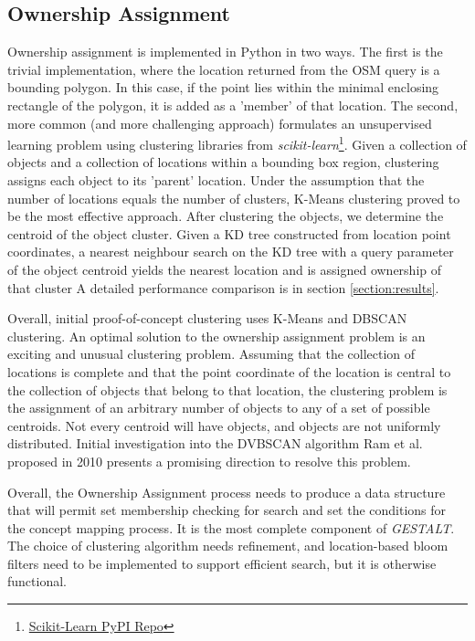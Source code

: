 \subsection{Ownership Assignment}
Ownership assignment is implemented in Python in two ways. The first is the trivial implementation, where the location returned from the OSM query is a bounding polygon. 
In this case, if the point lies within the minimal enclosing rectangle of the polygon, it is added as a 'member' of that location. 
The second, more common (and more challenging approach) formulates an unsupervised learning problem using clustering libraries from \textit{scikit-learn}\footnote{\href{https://pypi.org/project/scikit-learn/}{Scikit-Learn PyPI Repo}}. 
Given a collection of objects and a collection of locations within a bounding box region, clustering assigns each object to its 'parent' location. 
Under the assumption that the number of locations equals the number of clusters, K-Means clustering proved to be the most effective approach. 
After clustering the objects, we determine the centroid of the object cluster. Given a KD tree constructed from location point coordinates, a nearest neighbour search on the KD tree with a query parameter of the object centroid yields the nearest location and is assigned ownership of that cluster
A detailed performance comparison is in section \ref{section:results}. 

Overall, initial proof-of-concept clustering uses K-Means and DBSCAN clustering. An optimal solution to the ownership assignment problem is an exciting and unusual clustering problem. 
Assuming that the collection of locations is complete and that the point coordinate of the location is central to the collection of objects that belong to that location, the clustering problem is the assignment of an arbitrary number of objects to any of a set of possible centroids. Not every centroid will have objects, and objects are not uniformly distributed. Initial investigation into the DVBSCAN algorithm Ram et al. proposed in 2010 presents a promising direction to resolve this problem.\cite{Ram2010} 

Overall, the Ownership Assignment process needs to produce a data structure that will permit set membership checking for search and set the conditions for the concept mapping process. It is the most complete component of \textit{GESTALT}. The choice of clustering algorithm needs refinement, and location-based bloom filters need to be implemented to support efficient search, but it is otherwise functional. 


